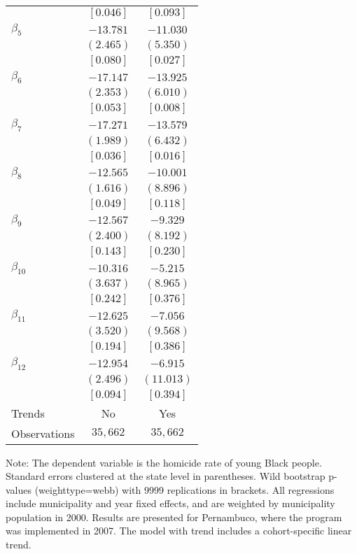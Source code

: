 \documentclass[12pt]{article}
\begin{document}
\begin{table}[H]
\begin{tabular}{lcc}
& $[  0.046]$ & $[  0.093]$ \\
$\beta_{5}$ & $-13.781$ & $-11.030$ \\
& $(  2.465)$ & $(  5.350)$ \\
& $[  0.080]$ & $[  0.027]$ \\
$\beta_{6}$ & $-17.147$ & $-13.925$ \\
& $(  2.353)$ & $(  6.010)$ \\
& $[  0.053]$ & $[  0.008]$ \\
$\beta_{7}$ & $-17.271$ & $-13.579$ \\
& $(  1.989)$ & $(  6.432)$ \\
& $[  0.036]$ & $[  0.016]$ \\
$\beta_{8}$ & $-12.565$ & $-10.001$ \\
& $(  1.616)$ & $(  8.896)$ \\
& $[  0.049]$ & $[  0.118]$ \\
$\beta_{9}$ & $-12.567$ & $ -9.329$ \\
& $(  2.400)$ & $(  8.192)$ \\
& $[  0.143]$ & $[  0.230]$ \\
$\beta_{10}$ & $-10.316$ & $ -5.215$ \\
& $(  3.637)$ & $(  8.965)$ \\
& $[  0.242]$ & $[  0.376]$ \\
$\beta_{11}$ & $-12.625$ & $ -7.056$ \\
& $(  3.520)$ & $(  9.568)$ \\
& $[  0.194]$ & $[  0.386]$ \\
$\beta_{12}$ & $-12.954$ & $ -6.915$ \\
& $(  2.496)$ & $( 11.013)$ \\
& $[  0.094]$ & $[  0.394]$ \\
\midrule
Trends & No & Yes \\
Observations & $   35,662$ & $   35,662$ \\
\bottomrule
\end{tabular}
\begin{threeparttable}
\begin{tablenotes}
\small
\item Note: The dependent variable is the homicide rate of young Black people. 
Standard errors clustered at the state level in parentheses. 
Wild bootstrap p-values (weighttype=webb) with 9999 replications in brackets. 
All regressions include municipality and year fixed effects, and are weighted by municipality population in 2000. 
Results are presented for Pernambuco, where the program was implemented in 2007. 
The model with trend includes a cohort-specific linear trend. 
\end{tablenotes}
\end{threeparttable}
\end{table}
\end{document}
